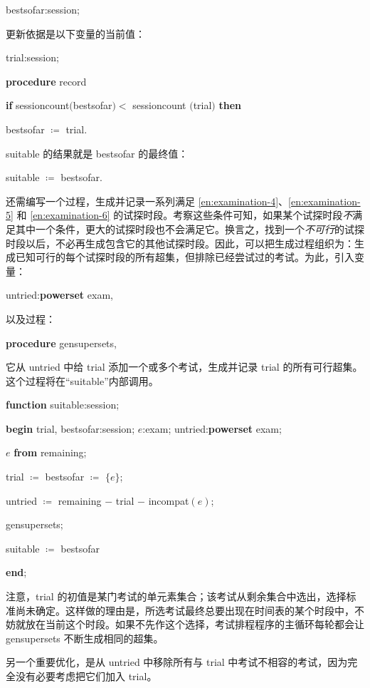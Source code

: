 \quad bestsofar:session;

\noindent
更新依据是以下变量的当前值：

\quad trial:session;

\quad \textbf{procedure} record

\quad \quad \textbf{if} sessioncount$($bestsofar$) <$ sessioncount $($trial$)$ \textbf{then}

\quad \quad \quad bestsofar $\coloneq$ trial.

\noindent
suitable 的结果就是 bestsofar 的最终值：

\quad suitable $\coloneq$ bestsofar.

还需编写一个过程，生成并记录一系列满足 \ref{en:examination-4}、\ref{en:examination-5} 和 \ref{en:examination-6} 的试探时段。考察这些条件可知，如果某个试探时段\textit{不}满足其中一个条件，更大的试探时段也不会满足它。换言之，找到一个\textit{不可行}的试探时段以后，不必再生成包含它的其他试探时段。因此，可以把生成过程组织为：生成已知可行的每个试探时段的所有超集，但排除已经尝试过的考试。为此，引入变量：

\quad untried:\textbf{powerset} exam,

\noindent
以及过程：

\quad \textbf{procedure} gensupersets,

\noindent
它从 untried 中给 trial 添加一个或多个考试，生成并记录 trial 的所有可行超集。这个过程将在“suitable”内部调用。

\quad \textbf{function} suitable:session;

\quad \quad \textbf{begin} trial, bestsofar:session; $e$:exam; untried:\textbf{powerset} exam;

\quad \quad \quad $e$ \textbf{from} remaining;

\quad \quad \quad trial $\coloneq$ bestsofar $\coloneq$ $\{e\}$;

\quad \quad \quad untried $\coloneq$ remaining $-$ trial $-$ incompat$(e)$;

\quad \quad \quad gensupersets;

\quad \quad \quad suitable $\coloneq$ bestsofar

\quad \quad \textbf{end};

\noindent
注意，trial 的初值是某门考试的单元素集合；该考试从剩余集合中选出，选择标准尚未确定。这样做的理由是，所选考试最终总要出现在时间表的某个时段中，不妨就放在当前这个时段。如果不先作这个选择，考试排程程序的主循环每轮都会让 gensupersets 不断生成相同的超集。

另一个重要优化，是从 untried 中移除所有与 trial 中考试不相容的考试，因为完全没有必要考虑把它们加入 trial。

